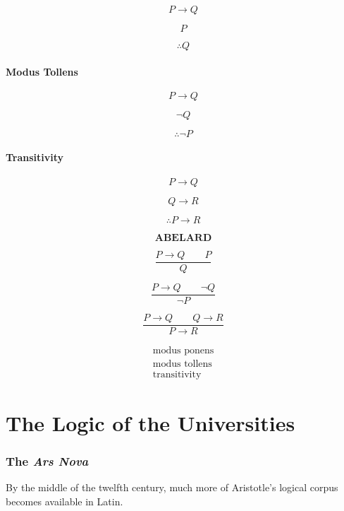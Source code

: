 \documentclass[11pt]{article}
\begin{document}
\[
P \rightarrow Q
\]

\[
P
\]

\[
\therefore Q
\]

\subsection*{Modus Tollens}

\[
P \rightarrow Q
\]

\[
\neg Q
\]

\[
\therefore \neg P
\]

\subsection*{Transitivity}

\[
P \rightarrow Q
\]

\[
Q \rightarrow R
\]

\[
\therefore P \rightarrow R
\]

\begin{whiteboard}
\[
\textbf{ABELARD}
\]

\[
\frac{P\rightarrow Q \qquad P}{Q}
\]

\[
\frac{P\rightarrow Q \qquad \neg Q}{\neg P}
\]

\[
\frac{P\rightarrow Q \qquad Q\rightarrow R}{P\rightarrow R}
\]

\[
\boxed{
\begin{array}{c}
\text{modus ponens}\\
\text{modus tollens}\\
\text{transitivity}
\end{array}
}
\]
\end{whiteboard}


\part{The Logic of the Universities}

\section{The \textit{Ars Nova}}

By the middle of the twelfth century, much more of Aristotle's
logical corpus becomes available in Latin.
\end{document}
